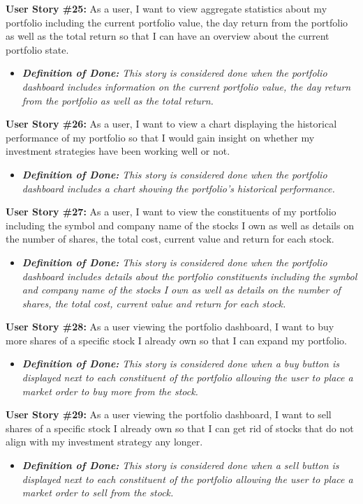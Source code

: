\noindent \textbf{User Story \#25:} As a user, I want to view aggregate statistics about my portfolio including the current portfolio value, the day return from the portfolio as well as the total return so that I can have an overview about the current portfolio state.
\begin{itemize}
	\item \textit{\textbf{Definition of Done:} This story is considered done when the portfolio dashboard includes information on the current portfolio value, the day return from the portfolio as well as the total return.} 
\end{itemize}
\noindent \textbf{User Story \#26:} As a user, I want to view a chart displaying the historical performance of my portfolio so that I would gain insight on whether my investment strategies have been working well or not.
\begin{itemize}
	\item \textit{\textbf{Definition of Done:} This story is considered done when the portfolio dashboard includes a chart showing the portfolio’s historical performance.} 
\end{itemize}
\noindent \textbf{User Story \#27:} As a user, I want to view the constituents of my portfolio including the symbol and company name of the stocks I own as well as details on the number of shares, the total cost, current value and return for each stock.
\begin{itemize}
	\item \textit{\textbf{Definition of Done:} This story is considered done when the portfolio dashboard includes details about the portfolio constituents including the symbol and company name of the stocks I own as well as details on the number of shares, the total cost, current value and return for each stock.} 
\end{itemize}
\noindent \textbf{User Story \#28:} As a user viewing the portfolio dashboard, I want to buy more shares of a specific stock I already own so that I can expand my portfolio.
\begin{itemize}
	\item \textit{\textbf{Definition of Done:} This story is considered done when a buy button is displayed next to each constituent of the portfolio allowing the user to place a market order to buy more from the stock.} 
\end{itemize}
\noindent \textbf{User Story \#29:} As a user viewing the portfolio dashboard, I want to sell shares of a specific stock I already own so that I can get rid of stocks that do not align with my investment strategy any longer.
\begin{itemize}
	\item \textit{\textbf{Definition of Done:} This story is considered done when a sell button is displayed next to each constituent of the portfolio allowing the user to place a market order to sell from the stock.} 
\end{itemize}

